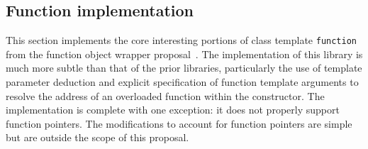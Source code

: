 \documentclass{article}
\begin{document}
\subsection{Function implementation}
\label{functionimpl}
This section implements the core interesting portions of class
template {\tt function} from the function object wrapper
proposal~\cite{Gregor02}. The implementation of this library is much
more subtle than that of the prior libraries, particularly the use of
template parameter deduction and explicit specification of function
template arguments to resolve the address of an overloaded function
within the constructor. The implementation is complete with one
exception: it does not properly support function pointers. The
modifications to account for function pointers are simple but are
outside the scope of this proposal.
\end{document}
